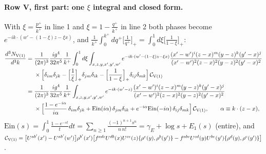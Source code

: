 \documentclass[10pt]{article}
\numberwithin{equation}{section}
\newcommand{\Ein}{\mathrm{Ein}}
\begin{document}
\paragraph{Row V, first part: one $\xi$ integral and closed form.} With $\xi=\frac{p^+}{k^+}$ in line 1 and $\xi=1-\frac{q^+}{k^+}$ in line 2 both phases become $e^{-ik\cdot(w'-(1-\xi)z-\xi x)}$, and $\frac{1}{k^+}\int_0^{k^+}dq^+\big[\frac{1}{q^+}\big]_+=\int_0^1d\xi\big[\frac{1}{1-\xi}\big]_+$:
\begin{align}
\frac{d^3N_{\rm V(1)}}{d^3k}={}&\frac{1}{(2\pi)^3}\frac{ig^4}{32\pi^5}\frac{1}{k^+}\int_0^1d\xi\int_{x,z,y,x',y',w'}e^{-ik\cdot(w'-(1-\xi)z-\xi x)}\frac{(x'-w')^{i}(z-x)^{m}(y-z)^{k}(y'-x)^{j}}{(x'-w')^{2}(z-x)^{2}(y-z)^{2}(y'-x)^{2}}\notag\\
&\times\Big[\delta_{im}\delta_{jk}-\Big[\frac1\xi\Big]_+\delta_{jm}\delta_{ik}-\Big[\frac{1}{1-\xi}\Big]_+\delta_{ij}\delta_{mk}\Big]\,\mathcal C_{\rm V(1)}\label{LT:eq:V1xi}\\
={}&\frac{1}{(2\pi)^3}\frac{ig^4}{32\pi^5}\frac{1}{k^+}\int_{x,z,y,x',y',w'}e^{-ik\cdot(w'-z)}\frac{(x'-w')^{i}(z-x)^{m}(y-z)^{k}(y'-x)^{j}}{(x'-w')^{2}(z-x)^{2}(y-z)^{2}(y'-x)^{2}}\notag\\
&\times\Big[\frac{1-e^{-i\alpha}}{i\alpha}\,\delta_{im}\delta_{jk}+\Ein(i\alpha)\,\delta_{jm}\delta_{ik}+e^{-i\alpha}\Ein(-i\alpha)\,\delta_{ij}\delta_{mk}\Big]\,\mathcal C_{\rm V(1)},\qquad\alpha\equiv k\cdot(z-x),\label{LT:eq:V1cf}
\end{align}
$\Ein(s)=\int_0^1\frac{1-e^{-st}}{t}dt=\sum_{n\ge1}\frac{(-1)^{n+1}s^n}{n\,n!}=\gamma_E+\log s+E_1(s)$ (entire), and $\mathcal C_{\rm V(1)}=\big[U^{ab'}(x')-U^{ab'}(w')\big]\rho^{b'}(x')\big[f^{adc}U^{db}(x)U^{ce}(z)\{\rho^e(y),\rho^b(y')\}-f^{abc}U^{cd}(y)U^{be}(y')\{\rho^d(y),\rho^e(y')\}\big]$.
\end{document}
